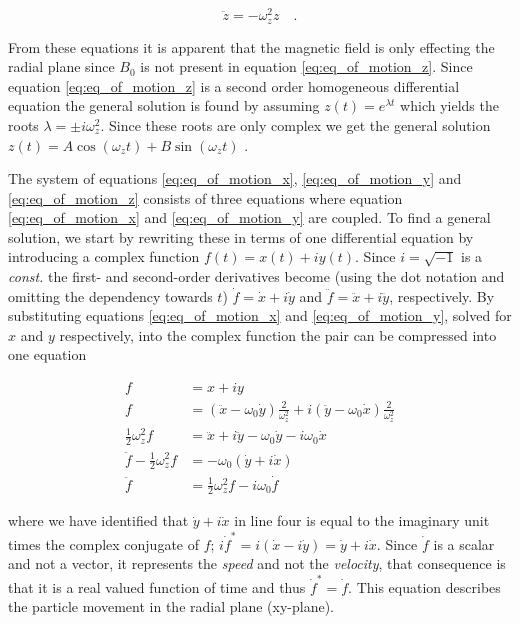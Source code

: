\documentclass[../main_proj3.tex]{subfiles}
\begin{document}
\begin{equation}
\label{eq:eq_of_motion_z}
\ddot z = - \omega_z^{2} z \quad .
\end{equation}

From these equations it is apparent that the magnetic field is only effecting the radial plane since $B_0$ is not present in equation \eqref{eq:eq_of_motion_z}. Since equation \eqref{eq:eq_of_motion_z} is a second order homogeneous differential equation the general solution is found by assuming $z(t)=e^{\lambda t}$ which yields the roots $\lambda= \pm i \omega_z^2$. Since these roots are only complex we get the general solution $z(t) = A\cos(\omega_z t) + B\sin(\omega_z t)$ \cite{NewcastleUniversity2024}.

The system of equations \eqref{eq:eq_of_motion_x}, \eqref{eq:eq_of_motion_y} and \eqref{eq:eq_of_motion_z} consists of three equations where equation \eqref{eq:eq_of_motion_x} and \eqref{eq:eq_of_motion_y} are coupled. To find a general solution, we start by rewriting these in terms of one differential equation by introducing a complex function $f(t)=x(t) + iy(t)$. Since $i= \sqrt{-1}$ is a \textit{const.} the first- and second-order derivatives become (using the dot notation and omitting the dependency towards $t$) $\dot f = \dot x + i \dot y$ and $\ddot f = \ddot x + i \ddot y$, respectively. By substituting equations \eqref{eq:eq_of_motion_x} and \eqref{eq:eq_of_motion_y}, solved for $x$ and $y$ respectively, into the complex function the pair can be compressed into one equation 

\begin{equation}
\label{eq:eq_of_motion_f}
\begin{split}
    f & = x + iy \\
    f & = (\ddot{x} - \omega_0 \dot{y}) \frac{2}{\omega_z^{2}} + i (\ddot{y} - \omega_0 \dot{x}) \frac{2}{\omega_z^{2}} \\
    \frac{1}{2} \omega_z^{2} f & = \ddot{x} + i\ddot{y} - \omega_0 \dot{y} - i \omega_0 \dot{x} \\
    \ddot{f} - \frac{1}{2} \omega_z^{2} f &= - \omega_0 ( \dot{y} +i \dot{x}) \\
    \ddot{f} & = \frac{1}{2} \omega_z^{2} f - i \omega_0 \dot{f}
\end{split}
\end{equation}

where we have identified that $\dot{y} +i \dot{x}$ in line four is equal to the imaginary unit times the complex conjugate of $f$; $i\dot{f}^* = i(\dot{x} - i\dot{y}) = \dot{y} + i \dot{x}$. Since $\dot{f}$ is a scalar and not a vector, it represents the \textit{speed} and not the \textit{velocity}, that consequence is that it is a real valued function of time and thus $\dot{f}^* = \dot{f}$. This equation describes the particle movement in the radial plane (xy-plane).
\end{document}
